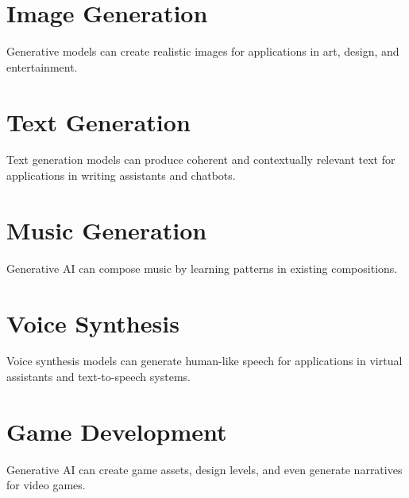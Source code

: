\section{Image Generation}
Generative models can create realistic images for applications in art, design, and entertainment.

\section{Text Generation}
Text generation models can produce coherent and contextually relevant text for applications in writing assistants and chatbots.

\section{Music Generation}
Generative AI can compose music by learning patterns in existing compositions.

\section{Voice Synthesis}
Voice synthesis models can generate human-like speech for applications in virtual assistants and text-to-speech systems.

\section{Game Development}
Generative AI can create game assets, design levels, and even generate narratives for video games.
